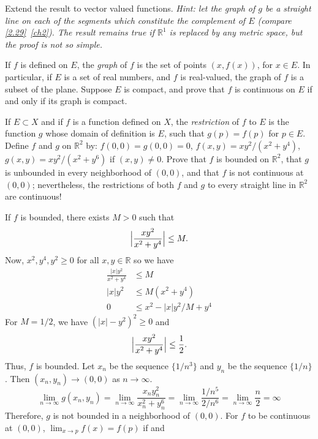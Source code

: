 \begin{exercise}
  Extend the result to vector valued functions.
  \textit{Hint: let the graph of \(g\) be a straight line on each of the
    segments which constitute the complement of \(E\) (compare
    \cref{2.29}~\cref{ch2}).
    The result remains true if \(\mathbb{R}^1\) is replaced by any metric
    space, but the proof is not so simple.}
\item
  If \(f\) is defined on \(E\), the \textit{graph} of \(f\) is the set of
  points \((x,f(x))\), for \(x\in E\).
  In particular, if \(E\) is a set of real numbers, and \(f\) is real-valued,
  the graph of \(f\) is a subset of the plane.
  Suppose \(E\) is compact, and prove that \(f\) is continuous on \(E\) if and
  only if its graph is compact.
\item
  If \(E\subset X\) and if \(f\) is a function defined on \(X\), the
  \textit{restriction} of \(f\) to \(E\) is the function \(g\) whose domain of
  definition is \(E\), such that \(g(p) = f(p)\) for \(p\in E\).
  Define \(f\) and \(g\) on \(\mathbb{R}^2\) by: \(f(0,0) = g(0,0) = 0\),
  \(f(x,y) = xy^2/(x^2 + y^4)\), \(g(x,y) = xy^2/(x^2 + y^6)\) if
  \((x,y)\neq 0\).
  Prove that \(f\) is bounded on \(\mathbb{R}^2\), that \(g\) is unbounded in
  every neighborhood of \((0,0)\), and that \(f\) is not continuous at
  \((0,0)\); nevertheless, the restrictions of both \(f\) and \(g\) to every
  straight line in \(\mathbb{R}^2\) are continuous!
  \par\smallskip
  If \(f\) is bounded, there exists \(M > 0\) such that
  \[
  \Bigl\lvert\frac{xy^2}{x^2 + y^4}\Bigr\rvert\leq M.
  \]
  Now, \(x^2,y^4,y^2\geq 0\) for all \(x,y\in\mathbb{R}\) so we have
  \begin{align*}
    \frac{\lvert x\rvert y^2}{x^2 + y^4} & \leq M\\
    \lvert x\rvert y^2 & \leq M(x^2 + y^4)\\
    0 & \leq x^2 - \lvert x\rvert y^2/M + y^4
  \end{align*}
  For \(M = 1/2\), we have \((\lvert x\rvert - y^2)^2\geq 0\) and
  \[
  \Bigl\lvert\frac{xy^2}{x^2 + y^4}\Bigr\rvert\leq\frac{1}{2}.
  \]
  Thus, \(f\) is bounded.
  Let \(x_n\) be the sequence \(\{1/n^3\}\) and \(y_n\) be the sequence
  \(\{1/n\}\).
  Then \((x_n,y_n)\to (0,0)\) as \(n\to\infty\).
  \[
  \lim_{n\to\infty}g(x_n,y_n) = \lim_{n\to\infty}\frac{x_ny_n^2}{x_n^2 + y_n^6}
  = \lim_{n\to\infty}\frac{1/n^5}{2/n^6} = \lim_{n\to\infty}\frac{n}{2} =
  \infty
  \]
  Therefore, \(g\) is not bounded in a neighborhood of \((0,0)\).
  For \(f\) to be continuous at \((0,0)\), \(\lim_{x\to p}f(x) = f(p)\) if and

\end{exercise}
